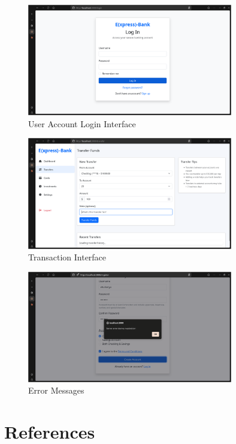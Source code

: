 \begin{figure}[h]
    \centering
    \includegraphics[width=0.8\textwidth]{login.png}
    \caption{User Account Login Interface}
\end{figure}

\begin{figure}[h]
    \centering
    \includegraphics[width=0.8\textwidth]{transfers.png}
    \caption{Transaction Interface}
\end{figure}

\begin{figure}[h]
    \centering
    \includegraphics[width=0.8\textwidth]{error.png}
    \caption{Error Messages}
\end{figure}

\chapter{References}

